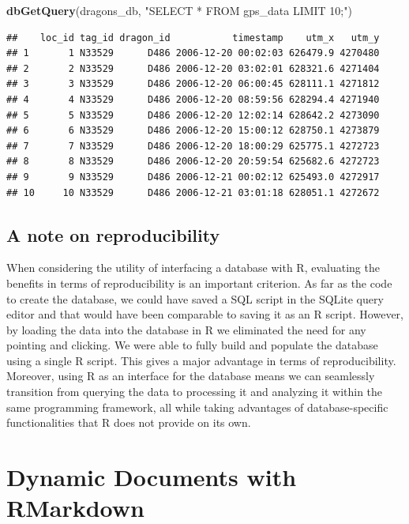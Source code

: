 \documentclass[
]{book}
\newenvironment{Shaded}{\begin{snugshade}}{\end{snugshade}}
\newcommand{\FunctionTok}[1]{\textcolor[rgb]{0.13,0.29,0.53}{\textbf{#1}}}
\newcommand{\NormalTok}[1]{#1}
\newcommand{\StringTok}[1]{\textcolor[rgb]{0.31,0.60,0.02}{#1}}
\begin{document}
\begin{Shaded}
\begin{Highlighting}[]
\FunctionTok{dbGetQuery}\NormalTok{(dragons\_db, }\StringTok{"SELECT * FROM gps\_data LIMIT 10;"}\NormalTok{)}
\end{Highlighting}
\end{Shaded}

\begin{verbatim}
##    loc_id tag_id dragon_id           timestamp    utm_x   utm_y
## 1       1 N33529      D486 2006-12-20 00:02:03 626479.9 4270480
## 2       2 N33529      D486 2006-12-20 03:02:01 628321.6 4271404
## 3       3 N33529      D486 2006-12-20 06:00:45 628111.1 4271812
## 4       4 N33529      D486 2006-12-20 08:59:56 628294.4 4271940
## 5       5 N33529      D486 2006-12-20 12:02:14 628642.2 4273090
## 6       6 N33529      D486 2006-12-20 15:00:12 628750.1 4273879
## 7       7 N33529      D486 2006-12-20 18:00:29 625775.1 4272723
## 8       8 N33529      D486 2006-12-20 20:59:54 625682.6 4272723
## 9       9 N33529      D486 2006-12-21 00:02:12 625493.0 4272917
## 10     10 N33529      D486 2006-12-21 03:01:18 628051.1 4272672
\end{verbatim}

\hypertarget{a-note-on-reproducibility}{%
\section{A note on reproducibility}\label{a-note-on-reproducibility}}

When considering the utility of interfacing a database with R, evaluating the
benefits in terms of reproducibility is an important criterion. As far as the
code to create the database, we could have saved a SQL script in the SQLite
query editor and that would have been comparable to saving it as an R script.
However, by loading the data into the database in R we eliminated the need for
any pointing and clicking. We were able to fully build and populate the database
using a single R script. This gives a major advantage in terms of reproducibility.
Moreover, using R as an interface for the database means we can seamlessly
transition from querying the data to processing it and analyzing it within the
same programming framework, all while taking advantages of database-specific
functionalities that R does not provide on its own.

\hypertarget{rmarkdown}{%
\chapter{Dynamic Documents with RMarkdown}\label{rmarkdown}}
\end{document}
